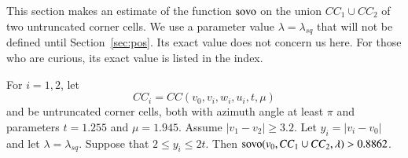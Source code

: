 This section makes an estimate of the function ${\operatorname{sovo}}$
on the union $CC_1\cup CC_2$ of two untruncated corner cells.
We use a parameter value $\lambda=\lambda_{sq}$ that will
not be defined until Section~\ref{sec:pos}.  Its exact value
does not concern us here.    For those who are curious, its
exact value is listed in the index.


\begin{lemma} 
For $i=1,2$, let $$CC_i =CC(v_0,v_i,w_i,u_i,t,\mu)$$ and 
be untruncated corner cells, both
with azimuth angle at least $\pi$ and parameters $t=1.255$ and 
$\mu=1.945$.
Assume $|v_1-v_2|\ge 3.2$.  Let $y_i =|v_i-v_0|$ and
let $\lambda = \lambda_{sq}$.
Suppose that
$2\le y_i\le 2t$.  Then
${\operatorname{sovo}}(v_0,CC_1\cup CC_2,\lambda) > 0.8862$.
\end{lemma}


